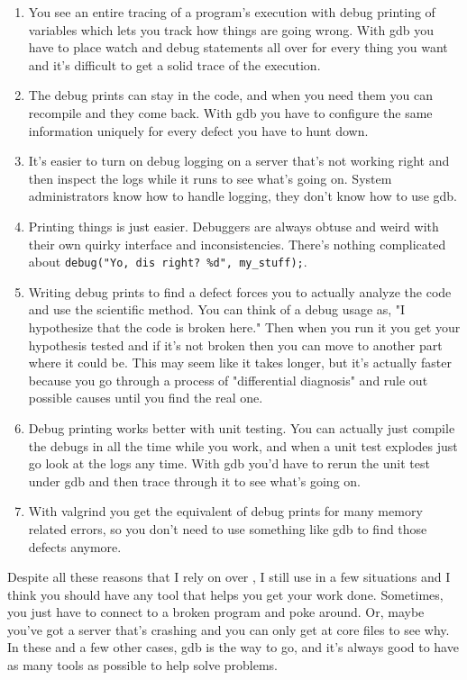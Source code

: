 \begin{enumerate}
\item You see an entire tracing of a program's execution with debug printing of variables which lets you
    track how things are going wrong.  With gdb you have to place watch and debug statements all over
    for every thing you want and it's difficult to get a solid trace of the execution.
\item The debug prints can stay in the code, and when you need them you can recompile and they come back.
    With gdb you have to configure the same information uniquely for every defect you have to hunt down.
\item It's easier to turn on debug logging on a server that's not working right and then inspect the logs while
    it runs to see what's going on.  System administrators know how to handle logging, they don't know how
    to use gdb.
\item Printing things is just easier. Debuggers are always obtuse and weird with their own quirky interface and
    inconsistencies.  There's nothing complicated about \verb|debug("Yo, dis right? %d", my_stuff);|.
\item Writing debug prints to find a defect forces you to actually analyze the code and use the scientific method.
    You can think of a debug usage as, "I hypothesize that the code is broken here."  Then when you run it
    you get your hypothesis tested and if it's not broken then you can move to another part where it could be.
    This may seem like it takes longer, but it's actually faster because you go through a process of "differential
    diagnosis" and rule out possible causes until you find the real one.
\item Debug printing works better with unit testing.  You can actually just compile the debugs in all the time
    while you work, and when a unit test explodes just go look at the logs any time.  With gdb you'd have to
    rerun the unit test under gdb and then trace through it to see what's going on.
\item With valgrind you get the equivalent of debug prints for many memory related errors, so you don't need to
    use something like gdb to find those defects anymore.
\end{enumerate}

Despite all these reasons that I rely on  over , I
still use  in a few situations and I think you should have any
tool that helps you get your work done.  Sometimes, you just have to connect to
a broken program and poke around.  Or, maybe you've got a server that's
crashing and you can only get at core files to see why.  In these and a few
other cases, gdb is the way to go, and it's always good to have as many tools
as possible to help solve problems.

